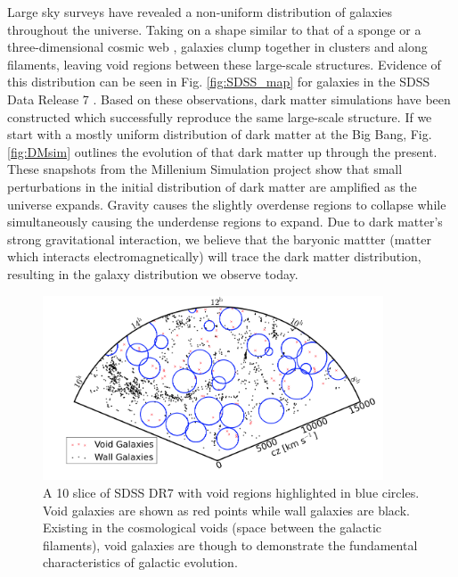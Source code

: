 Large sky surveys \citep[such as the Sloan Digital Sky Survey --- 
SDSS;][]{York00} have revealed a non-uniform distribution of galaxies throughout 
the universe.  Taking on a shape similar to that of a sponge or a 
three-dimensional cosmic web \citep{Bond96}, galaxies clump together in clusters 
and along filaments, leaving void regions between these large-scale structures.  
Evidence of this distribution can be seen in Fig. \ref{fig:SDSS_map} for 
galaxies in the SDSS Data Release 7 \citep[SDSS DR7;][]{Abazajian09}.  Based on 
these observations, dark matter simulations have been constructed which 
successfully reproduce the same large-scale structure.  If we start with a 
mostly uniform distribution of dark matter at the Big Bang, Fig. \ref{fig:DMsim} 
outlines the evolution of that dark matter up through the present.  These 
snapshots from the Millenium Simulation project \citep{Springel05} show that 
small perturbations in the initial distribution of dark matter are amplified as 
the universe expands.  Gravity causes the slightly overdense regions to collapse 
while simultaneously causing the underdense regions to expand.  Due to dark 
matter's strong gravitational interaction, we believe that the baryonic mattter 
(matter which interacts electromagnetically) will trace the dark matter 
distribution, resulting in the galaxy distribution we observe today.


\begin{figure}
    \includegraphics[width=0.9\textwidth]{Images/Intro/VoidFinder}
    \caption[Sky map highlighting voids and void galaxies]{A 10 \hMpc slice of 
    SDSS DR7 \citep[Fig. 1]{Moorman14} with void regions highlighted in blue 
    circles.  Void galaxies are shown as red points while wall galaxies are 
    black.  Existing in the cosmological voids (space between the galactic 
    filaments), void galaxies are though to demonstrate the fundamental 
    characteristics of galactic evolution.}
\end{figure}

